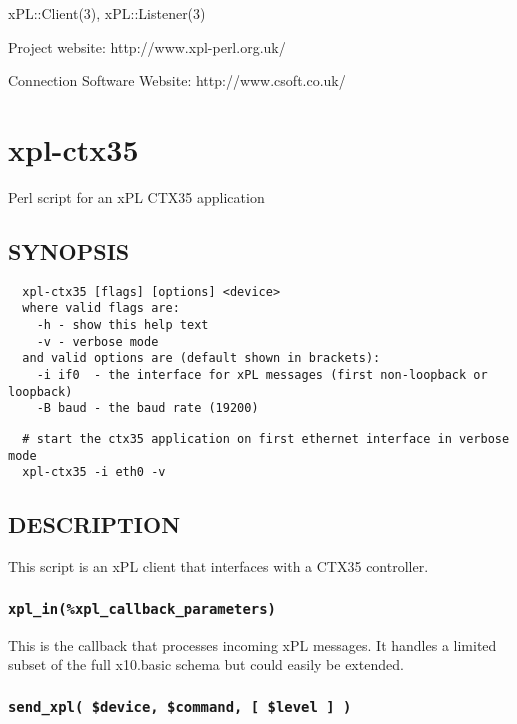 xPL::Client(3), xPL::Listener(3)



Project website: http://www.xpl-perl.org.uk/



Connection Software Website: http://www.csoft.co.uk/

\section{xpl-ctx35\label{xpl-ctx35}}


Perl script for an xPL CTX35 application

\subsection*{SYNOPSIS\label{xpl-ctx35_SYNOPSIS}}
\begin{verbatim}
  xpl-ctx35 [flags] [options] <device>
  where valid flags are:
    -h - show this help text
    -v - verbose mode
  and valid options are (default shown in brackets):
    -i if0  - the interface for xPL messages (first non-loopback or loopback)
    -B baud - the baud rate (19200)
\end{verbatim}
\begin{verbatim}
  # start the ctx35 application on first ethernet interface in verbose mode
  xpl-ctx35 -i eth0 -v
\end{verbatim}
\subsection*{DESCRIPTION\label{xpl-ctx35_DESCRIPTION}}


This script is an xPL client that interfaces with a CTX35 controller.

\subsubsection*{\texttt{xpl\_in(\%xpl\_callback\_parameters)}\label{xpl-ctx35_xpl_in_xpl_callback_parameters_}}


This is the callback that processes incoming xPL messages.  It handles
a limited subset of the full x10.basic schema but could easily be
extended.

\subsubsection*{\texttt{send\_xpl( \$device, \$command, [ \$level ] )}\label{xpl-ctx35_send_xpl_device_command_level_}}


